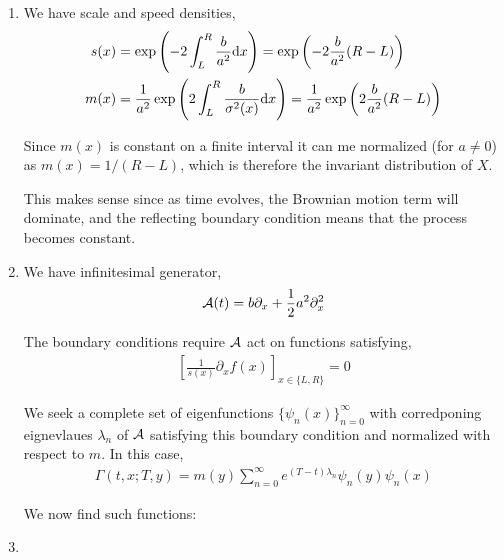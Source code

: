 \begin{solution}[Solution]
\begin{enumerate}[label=(\alph*)]
    \item We have scale and speed densities,
        \begin{align*}
            s(x) &= \exp \left( -2\int_L^R \frac{b}{a^2}\mathrm{d} x \right)
            = \exp \left( -2 \frac{b}{a^2} (R-L) \right)
            \\
            m(x) &= \frac{1}{a^2}\exp \left( 2\int_L^R \frac{b}{\sigma^2(x)}\mathrm{d} x \right)
            = \frac{1}{a^2} \exp \left( 2 \frac{b}{a^2} (R-L) \right)
        \end{align*}

        Since \( m(x) \) is constant on a finite interval it can me normalized (for \( a\neq 0 \)) as \( m(x) = 1/(R-L) \), which is therefore the invariant distribution of \( X \). 

        This makes sense since as time evolves, the Brownian motion term will dominate, and the reflecting boundary condition means that the process becomes constant.

        
        
    \item We have infinitesimal generator,
        \begin{align*}
            \mathcal{A}(t) = b\partial_x + \frac{1}{2}a^2\partial_x^2 
        \end{align*}

        The boundary conditions require \( \mathcal{A} \) act on functions satisfying,
        \begin{align*}
            \left[\frac{1}{s(x)}\partial_x f(x) \right]_{x\in\{L,R\}} = 0
        \end{align*}

        We seek a complete set of eigenfunctions \( \{\psi_n(x)\}_{n=0}^{\infty} \) with corredponing eignevlaues \( \lambda_n \) of \( \mathcal{A} \) satisfying this boundary condition and normalized with respect to \( m \). In this case,
        \begin{align*}
            \Gamma(t,x;T,y) = m(y) \sum_{n=0}^{\infty} e^{(T-t) \lambda_n}\psi_n(y)\psi_n(x)
        \end{align*}
       

        We now find such functions:
       
       
    \item
\end{enumerate}
\end{solution}

